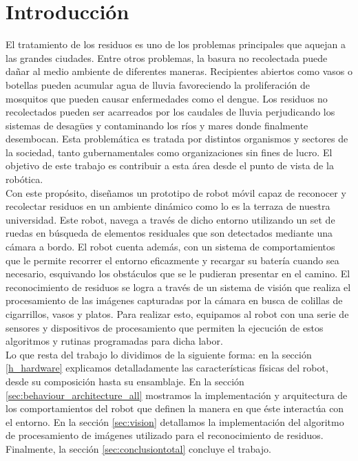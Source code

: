 
\section{\label{intro} Introducci\'on}
El tratamiento de los residuos es uno de los problemas principales que 
aquejan a las grandes ciudades. Entre otros problemas, la basura no 
recolectada puede da\~nar al medio ambiente de diferentes maneras. Recipientes
abiertos como vasos o botellas pueden acumular agua de lluvia favoreciendo la 
proliferaci\'on de mosquitos que pueden causar enfermedades como el dengue. Los
residuos no recolectados pueden ser acarreados por los caudales de lluvia
perjudicando los sistemas de desag\"ues y contaminando los r\'ios y mares donde
finalmente desembocan. Esta problem\'atica es tratada por distintos organismos
y sectores de la sociedad, tanto gubernamentales como organizaciones sin fines
de lucro. El objetivo de este trabajo es contribuir a esta \'area desde el
punto de vista de la rob\'otica.
\\\indent
Con este prop\'osito, dise\~namos un prototipo de robot m\'ovil capaz de
reconocer y recolectar residuos en un ambiente din\'amico como lo es la terraza
de nuestra universidad. Este robot, navega a trav\'es de dicho entorno
utilizando un set de ruedas en b\'usqueda de elementos residuales que
son detectados mediante una c\'amara a bordo. El robot cuenta adem\'as,
con un sistema de comportamientos que le permite recorrer el entorno
eficazmente y recargar su bater\'ia cuando sea necesario, esquivando
los obst\'aculos que se le pudieran presentar en el camino. El reconocimiento
de residuos se logra a trav\'es de un sistema de visi\'on que realiza el
procesamiento de las im\'agenes capturadas por la cámara en busca de colillas
de cigarrillos, vasos y platos. Para realizar esto, equipamos al robot con
una serie de sensores y dispositivos de procesamiento que permiten la
ejecución de estos algoritmos y rutinas programadas para dicha labor.
\\\indent
Lo que resta del trabajo lo dividimos de la siguiente forma: en la secci\'on
\ref{h_hardware} explicamos detalladamente las caracter\'isticas f\'isicas del
robot, desde su composici\'on hasta su ensamblaje. En la secci\'on
\ref{sec:behaviour_architecture_all} mostramos la implementaci\'on y
arquitectura de los comportamientos del robot que definen la manera en que
\'este interact\'ua con el entorno. En la secci\'on \ref{sec:vision}
detallamos la implementaci\'on del algoritmo de procesamiento de im\'agenes
utilizado para el reconocimiento de residuos. Finalmente, la secci\'on
\ref{sec:conclusiontotal} concluye el trabajo.

